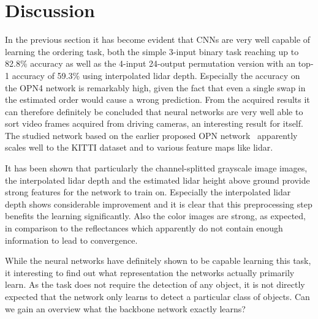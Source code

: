 %
\newpage
\chapter{Discussion}
\label{ch:discussion}
In the previous section it has become evident that CNNs are very well capable of learning the ordering task, both the simple 3-input binary task reaching up to 82.8\% accuracy as well as the 4-input 24-output permutation version with an top-1 accuracy of 59.3\% using interpolated lidar depth. Especially the accuracy on the OPN4 network is remarkably high, given the fact that even a single swap in the estimated order would cause a wrong prediction. From the acquired results it can therefore definitely be concluded that neural networks are very well able to sort video frames acquired from driving cameras, an interesting result for itself. The studied network based on the earlier proposed OPN network~\cite{lee2017} apparently scales well to the KITTI dataset and to various feature maps like lidar.

It has been shown that particularly the channel-splitted grayscale image images, the interpolated lidar depth and the estimated lidar height above ground provide strong features for the network to train on. Especially the interpolated lidar depth shows considerable improvement and it is clear that this preprocessing step benefits the learning significantly. Also the color images are strong, as expected, in comparison to the reflectances which apparently do not contain enough information to lead to convergence.


While the neural networks have definitely shown to be capable learning this task, it interesting to find out what representation the networks actually primarily learn. As the task does not require the detection of any object, it is not directly expected that the network only learns to detect a particular class of objects. Can we gain an overview what the backbone network exactly learns? 

